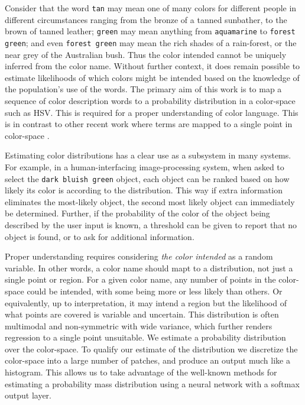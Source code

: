 \documentclass[11pt,a4paper]{article}
\newcommand{\parencite}{\citep}
\begin{document}
Consider that the word \texttt{tan} may mean one of many colors for different people in different circumstances ranging from the bronze of a tanned sunbather, to the brown of tanned leather;
\texttt{green} may mean anything from \texttt{aquamarine} to \texttt{forest green};
 and even \texttt{forest green} may mean the rich shades of a rain-forest, or the near grey of the Australian bush.
Thus the color intended cannot be uniquely inferred from the color name.
Without further context, it does remain possible  to estimate likelihoods of which colors might be intended based on the knowledge of the population's use of the words.
The primary aim of this work is to map a sequence of color description words to a probability distribution in a color-space such as HSV.
This is required for a proper understanding of color language.
This is in contrast to other recent work where terms are mapped to a single point in color-space \parencite{DBLP:journals/corr/KawakamiDRS16}.


Estimating color distributions has a clear use as a subsystem in many systems.
For example, in a human-interfacing image-processing system, when asked to select the \texttt{dark bluish green} object, each object can be ranked based on how likely its color is according to the distribution.
This way if extra information eliminates the most-likely object, the second most likely object can immediately be determined.
Further, if the probability of the color of the object being described by the user input is known, a threshold can be given to report that no object is found, or to ask for additional information.


Proper understanding requires considering \emph{the color intended} as a random variable.
In other words, a color name should mapt to a distribution, not just a single point or region.
For a given color name, any number of points in the color-space could be intended, with some being more or less likely than others.
Or equivalently, up to interpretation, it may intend a region but the likelihood of what points are covered is variable and uncertain.
This distribution is often multimodal and non-symmetric with wide variance, which further renders regression to a single point unsuitable.
We estimate a probability distribution over the color-space.
To qualify our estimate of the distribution we discretize the color-space into a large number of patches, and produce an output much like a histogram.
This allows us to take advantage of the well-known methods for estimating a probability mass distribution using a neural network with a softmax output layer.
\end{document}
